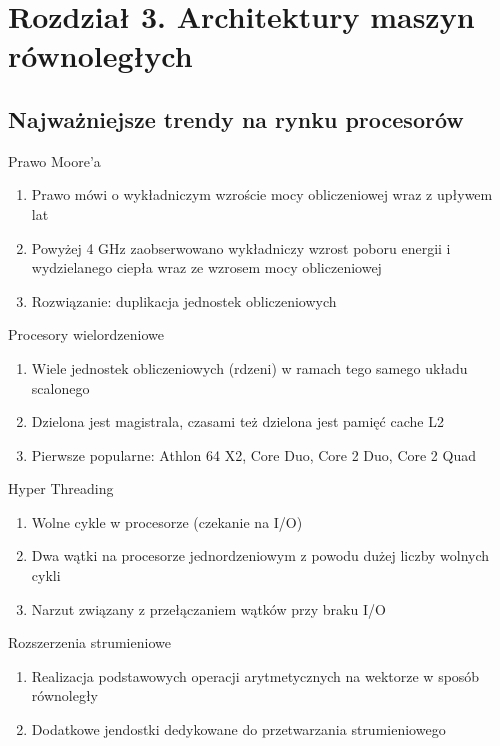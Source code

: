 \documentclass{beamer}
\begin{document}
\section{Rozdział 3. Architektury maszyn równoległych}

\subsection{Najważniejsze trendy na rynku procesorów}

\begin{frame}{Prawo Moore'a}
  \begin{enumerate}
  \item Prawo mówi o wykładniczym wzroście mocy obliczeniowej wraz z upływem lat
  \item Powyżej 4 GHz zaobserwowano wykładniczy wzrost poboru energii i wydzielanego ciepła wraz ze wzrosem mocy obliczeniowej
  \item Rozwiązanie: duplikacja jednostek obliczeniowych
  \end{enumerate}
\end{frame}

\begin{frame}{Procesory wielordzeniowe}
  \begin{enumerate}
  \item Wiele jednostek obliczeniowych (rdzeni) w ramach tego samego układu scalonego
  \item Dzielona jest magistrala, czasami też dzielona jest pamięć cache L2
  \item Pierwsze popularne: Athlon 64 X2, Core Duo, Core 2 Duo, Core 2 Quad
  \end{enumerate}
\end{frame}

\begin{frame}{Hyper Threading}
  \begin{enumerate}
  \item Wolne cykle w procesorze (czekanie na I/O)
  \item Dwa wątki na procesorze jednordzeniowym z powodu dużej liczby wolnych cykli
  \item Narzut związany z przełączaniem wątków przy braku I/O
  \end{enumerate}
\end{frame}

\begin{frame}{Rozszerzenia strumieniowe}
  \begin{enumerate}
  \item Realizacja podstawowych operacji arytmetycznych na wektorze w sposób równoległy
  \item Dodatkowe jendostki dedykowane do przetwarzania strumieniowego
  \end{enumerate}
\end{frame}
\end{document}
